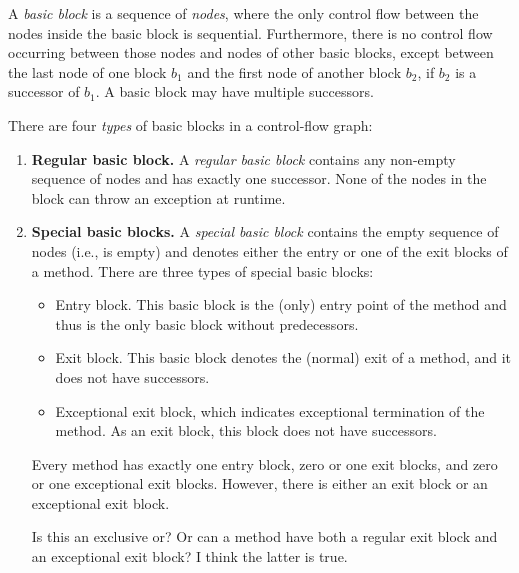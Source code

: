 \begin{definition}
    A \emph{basic block} is a sequence of \emph{nodes}, where the only
    control flow between the nodes inside
    the basic block is sequential.  Furthermore, there is no
    control flow occurring between those nodes and nodes of other basic
    blocks, except between the last node of one block $b_1$ and the first node
    of another block $b_2$, if $b_2$ is a successor of $b_1$.  A basic
    block may have multiple successors.
\end{definition}



\begin{definition}
    There are four \emph{types} of basic blocks in a control-flow graph:
    \begin{enumerate}
        \item \textbf{Regular basic block.} A \emph{regular basic
          block} contains any non-empty sequence of nodes and has
          exactly one successor.  None of the nodes in the block can
          throw an exception at runtime.

        \item \textbf{Special basic blocks.} A \emph{special basic
          block} contains the empty sequence of nodes (i.e., is empty)
          and denotes either the entry or one of the exit blocks of a
          method. There are three types of special basic blocks:
        \begin{itemize}
            \item Entry block. This basic block is the (only) entry
              point of the method and thus is the only basic block
              without predecessors.
            \item Exit block. This basic block denotes the (normal)
              exit of a method, and it does not have successors.
            \item Exceptional exit block, which indicates exceptional
              termination of the method. As an exit block, this block
              does not have successors.
        \end{itemize}
        Every method has exactly one entry block, zero or one exit blocks,
        and zero or one exceptional exit blocks. However, there is
        either an exit block or an exceptional exit block.
        \begin{workinprogress}
        Is this an exclusive or? Or can a method have both a regular
        exit block and an exceptional exit block? I think the latter
        is true.
        \end{workinprogress}


\end{enumerate}
\end{definition}
